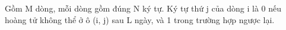 Gồm M dòng, mỗi dòng gồm đúng N ký tự. Ký tự thứ j của dòng i là 0 nếu hoàng tử không thể ở ô (i, j) sau L ngày, và 1 trong trường hợp ngược lại.
